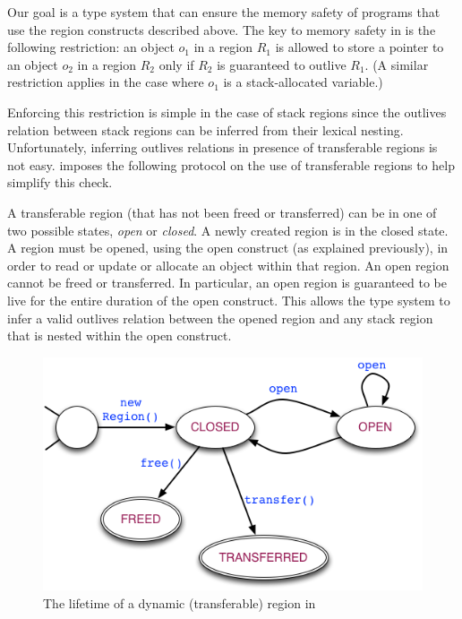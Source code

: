 Our goal is a type system that can ensure the memory safety of
programs that use the region constructs described above.  The key to
memory safety in \name is the following restriction: an object $o_1$
in a region $R_1$ is allowed to store a pointer to an object $o_2$ in
a region $R_2$ only if $R_2$ is guaranteed to outlive $R_1$.  (A
similar restriction applies in the case where $o_1$ is a
stack-allocated variable.)

Enforcing this restriction is simple in the case of stack regions
since the outlives relation between stack regions can be inferred from
their lexical nesting. Unfortunately, inferring outlives relations
in presence of transferable regions is not easy.  \name imposes the following
protocol on the use of transferable regions to help simplify this
check.

A transferable region (that has not been freed or transferred) can be
in one of two possible states, \emph{open} or \emph{closed}. A newly
created region is in the closed state.  A region must be opened, using
the open construct (as explained previously), in order to read or
update or allocate an object within that region.  An open region
cannot be freed or transferred.  In particular, an open region is
guaranteed to be live for the entire duration of the open construct.
This allows the type system to infer a valid outlives relation between
the opened region and any stack region that is nested within the open
construct.

\begin{figure} 
\includegraphics[scale=0.45]{region-fsm.png}
\caption{The lifetime of a dynamic (transferable) region in \name}
\label{fig:region-fsm} 
\vspace*{-0.25in} 
\end{figure}


